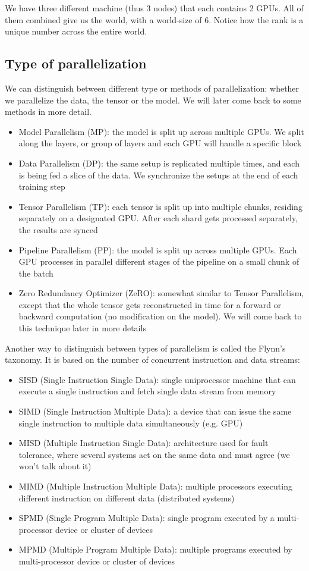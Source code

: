 \documentclass{article}
\begin{document}
We have three different machine (thus 3 nodes) that each contains 2 GPUs. All of them combined give us the world, with a world-size of 6. Notice how the rank is a unique number across the entire world.

\subsection{Type of parallelization}
We can distinguish between different type or methods of parallelization: whether we parallelize the data, the tensor or the model. We will later come back to some methods in more detail.
\begin{itemize}
  \item Model Parallelism (MP): the model is split up across multiple GPUs. We split along the layers, or group of layers and each GPU will handle a specific block
  \item Data Parallelism (DP): the same setup is replicated multiple times, and each is being fed a slice of the data. We synchronize the setups at the end of each training step
  \item Tensor Parallelism (TP): each tensor is split up into multiple chunks, residing separately on a designated GPU. After each shard gets processed separately, the results are synced
  \item Pipeline Parallelism (PP): the model is split up across multiple GPUs. Each GPU processes in parallel different stages of the pipeline on a small chunk of the batch
  \item Zero Redundancy Optimizer (ZeRO): somewhat similar to Tensor Parallelism, except that the whole tensor gets reconstructed in time for a forward or backward computation (no modification on the model). We will come back to this technique later in more details
\end{itemize}

Another way to distinguish between types of parallelism is called the Flynn's taxonomy. It is based on the number of concurrent instruction and data streams:
\begin{itemize}
  \item SISD (Single Instruction Single Data): single uniprocessor machine that can execute a single instruction and fetch single data stream from memory
  \item SIMD (Single Instruction Multiple Data): a device that can issue the same single instruction to multiple data simultaneously (e.g. GPU)
  \item MISD (Multiple Instruction Single Data): architecture used for fault tolerance, where several systems act on the same data and must agree (we won't talk about it)
  \item MIMD (Multiple Instruction Multiple Data): multiple processors executing different instruction on different data (distributed systems)
  \item SPMD (Single Program Multiple Data): single program executed by a multi-processor device or cluster of devices
  \item MPMD (Multiple Program Multiple Data): multiple programs executed by multi-processor device or cluster of devices
\end{itemize}
\end{document}
